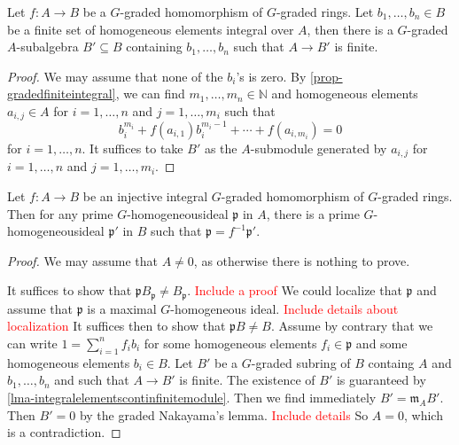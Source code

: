 \begin{lemma}\label{lma-integralelementscontinfinitemodule}
    Let $f:A\rightarrow B$ be a $G$-graded homomorphism of $G$-graded rings. Let $b_1,\ldots,b_n\in B$ be a finite set of homogeneous elements integral over $A$, then there is a $G$-graded $A$-subalgebra $B'\subseteq B$ containing $b_1,\ldots,b_n$ such that $A\rightarrow B'$ is finite.
\end{lemma}
\begin{proof}
    We may assume that none of the $b_i$'s is zero.
    By \cref{prop-gradedfiniteintegral}, we can find $m_1,\ldots,m_n\in \mathbb{N}$ and homogeneous elements $a_{i,j}\in A$ for $i=1,\ldots,n$ and $j=1,\ldots,m_i$ such that
    \[
        b_i^{m_i}+f(a_{i,1})  b_i^{m_i-1}+\cdots+f(a_{i,m_i})=0
    \]
    for $i=1,\ldots,n$. It suffices to take $B'$ as the $A$-submodule generated by $a_{i,j}$ for $i=1,\ldots,n$ and $j=1,\ldots,m_i$.
\end{proof}

\begin{proposition}\label{prop-integralextprimelift}
    Let $f:A\rightarrow B$ be an injective integral $G$-graded homomorphism of $G$-graded rings. Then for any prime $G$-homogeneousideal $\mathfrak{p}$ in $A$, there is a prime $G$-homogeneousideal $\mathfrak{p}'$ in $B$ such that $\mathfrak{p}=f^{-1}\mathfrak{p}'$.
\end{proposition}
\begin{proof}
    We may assume that $A\neq 0 $, as otherwise there is nothing to prove.

    It suffices to show that $\mathfrak{p}B_{\mathfrak{p}}\neq B_{\mathfrak{p}}$. \textcolor{red}{Include a proof}
    We could localize that $\mathfrak{p}$ and assume that $\mathfrak{p}$ is a maximal $G$-homogeneous ideal. \textcolor{red}{Include details about localization} It suffices then to show that $\mathfrak{p}B\neq B$. Assume by contrary that we can write $1=\sum_{i=1}^n f_i b_i$ for some homogeneous elements $f_i\in \mathfrak{p}$ and some homogeneous elements $b_i\in B$. Let $B'$ be a $G$-graded subring of $B$ containg $A$ and $b_1,\ldots,b_n$ and such that $A\rightarrow B'$ is finite. The existence of $B'$ is guaranteed by \cref{lma-integralelementscontinfinitemodule}. Then we find immediately $B'=\mathfrak{m}_AB'$. Then $B'=0$ by the graded Nakayama's lemma. \textcolor{red}{Include details} So $A=0$, which is a contradiction.
\end{proof}

